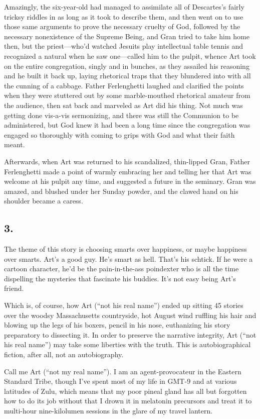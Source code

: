 Amazingly, the six-year-old had managed to assimilate all of
Descartes’s fairly tricksy riddles in as long as it took to
describe them, and then went on to use those same arguments to
prove the necessary cruelty of God, followed by the necessary
nonexistence of the Supreme Being, and Gran tried to take him home
then, but the priest—who’d watched Jesuits play intellectual table
tennis and recognized a natural when he saw one—called him to the
pulpit, whence Art took on the entire congregation, singly and in
bunches, as they assailed his reasoning and he built it back up,
laying rhetorical traps that they blundered into with all the
cunning of a cabbage. Father Ferlenghetti laughed and clarified the
points when they were stuttered out by some marble-mouthed
rhetorical amateur from the audience, then sat back and marveled as
Art did his thing. Not much was getting done vis-a-vis sermonizing,
and there was still the Communion to be administered, but God knew
it had been a long time since the congregation was engaged so
thoroughly with coming to grips with God and what their faith
meant.

Afterwards, when Art was returned to his scandalized, thin-lipped
Gran, Father Ferlenghetti made a point of warmly embracing her and
telling her that Art was welcome at his pulpit any time, and
suggested a future in the seminary. Gran was amazed, and blushed
under her Sunday powder, and the clawed hand on his shoulder became
a caress.

\subsection{3.}

The theme of this story is choosing smarts over happiness, or maybe
happiness over smarts. Art’s a good guy. He’s smart as hell. That’s
his schtick. If he were a cartoon character, he’d be the
pain-in-the-ass poindexter who is all the time dispelling the
mysteries that fascinate his buddies. It’s not easy being Art’s
friend.

Which is, of course, how Art (“not his real name”) ended up sitting
45 stories over the woodsy Massachusetts countryside, hot August
wind ruffling his hair and blowing up the legs of his boxers,
pencil in his nose, euthanizing his story preparatory to dissecting
it. In order to preserve the narrative integrity, Art (“not his
real name”) may take some liberties with the truth. This is
autobiographical fiction, after all, not an autobiography.

Call me Art (“not my real name”). I am an agent-provocateur in the
Eastern Standard Tribe, though I’ve spent most of my life in GMT-9
and at various latitudes of Zulu, which means that my poor pineal
gland has all but forgotten how to do its job without that I drown
it in melatonin precursors and treat it to multi-hour
nine-kilolumen sessions in the glare of my travel lantern.

